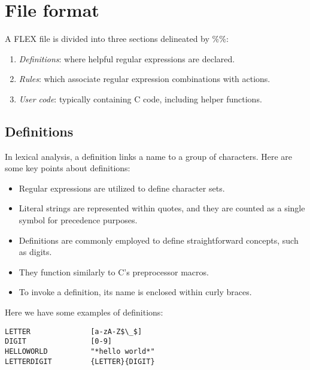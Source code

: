 \section{File format}

A FLEX file is divided into three sections delineated by $\%\%$:
\begin{enumerate}
    \item \textit{Definitions}: where helpful regular expressions are declared.
    \item \textit{Rules}: which associate regular expression combinations with actions.
    \item \textit{User code}: typically containing C code, including helper functions.
\end{enumerate}

\subsection{Definitions}
In lexical analysis, a definition links a name to a group of characters. 
Here are some key points about definitions:
\begin{itemize}
    \item Regular expressions are utilized to define character sets.
    \item Literal strings are represented within quotes, and they are counted as a single symbol for precedence purposes.
    \item Definitions are commonly employed to define straightforward concepts, such as digits.
    \item They function similarly to C's preprocessor macros.
    \item To invoke a definition, its name is enclosed within curly braces.
\end{itemize}
\begin{example}
    Here we have some examples of definitions: \\
    \begin{lstlisting}[style=C]
LETTER              [a-zA-Z$\_$] 
DIGIT               [0-9]
HELLOWORLD          "*hello world*"
LETTERDIGIT         {LETTER}{DIGIT}
    \end{lstlisting}
\end{example}

